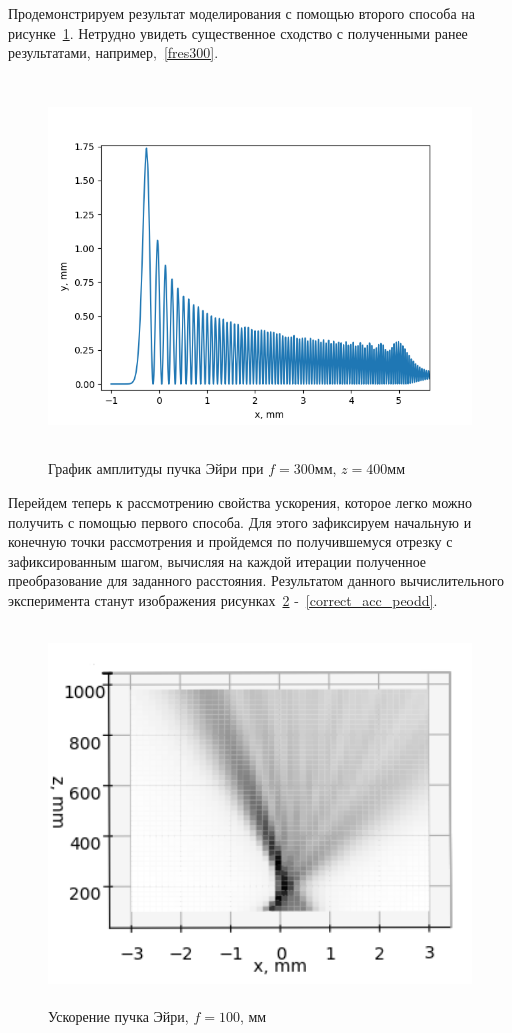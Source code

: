 {    Продемонстрируем результат моделирования с помощью второго способа на рисунке~\ref{four_fres_300_400}.
    Нетрудно увидеть существенное сходство с полученными ранее результатами, например,~\ref{fres300}.
    \begin{figure}[H]
        \centering
        \includegraphics[height = 10cm]{plots/four_fres_300_400.png}
        \caption{График амплитуды пучка Эйри при $f = 300$мм, $z = 400$мм}
        \label{four_fres_300_400}
    \end{figure}
    \vspace{0.5cm}

    Перейдем теперь к рассмотрению свойства ускорения, которое легко можно получить с помощью первого способа.
    Для этого зафиксируем начальную и конечную точки рассмотрения и пройдемся по получившемуся отрезку с зафиксированным шагом,
    вычисляя на каждой итерации полученное преобразование для заданного расстояния.
    Результатом данного вычислительного эксперимента станут изображения рисунках~\ref{correct_acc} -~\ref{correct_acc_peodd}.
    \begin{figure}[H]
        \centering
        \includegraphics[height = 10cm]{plots/ai_acc_before_focus.png}
        \caption{Ускорение пучка Эйри, $f = 100$, мм}
        \label{correct_acc}
    \end{figure}

}
